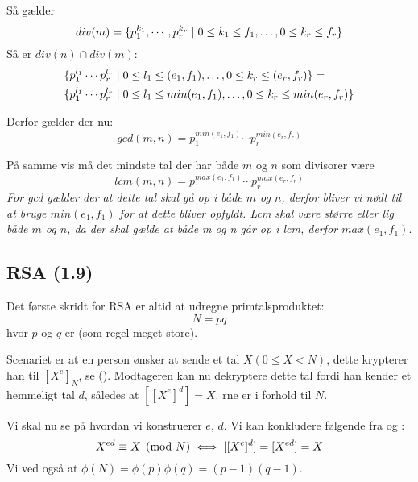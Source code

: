 Så gælder
\begin{equation*}
  div(m) = \{  p_1 ^ {k_1}, \cdots, p_r ^ {k_r} \mid 0 \leq k_1 \leq f_1,
  \ldots, 0 \leq k_r \leq f_r \}
\end{equation*}
Så er $div(n) \cap div(m)$:
\begin{align*}
  &\{ p_1^{l_1} \cdots p_r^{l_r} \mid 0 \leq l_1 \leq (e_1, f_1),
  \ldots, 0 \leq k_r \leq (e_r,f_r) \}=\\
  &\{ p_1^{l_1} \cdots p_r^{l_r} \mid 0 \leq l_1 \leq min(e_1, f_1),
  \ldots, 0 \leq k_r \leq min(e_r,f_r) \}
\end{align*}

Derfor gælder der nu:
\begin{equation*}
  gcd(m,n) = p_1^{min(e_1 , f_1)} \cdots p_r^{min(e_r , f_r)}
\end{equation*}

På samme vis må det mindste tal der har både $m$ og $n$ som divisorer
være 
\begin{equation*}
  lcm(m,n) = p_1^{max(e_1 , f_1)} \cdots p_r^{max(e_r , f_r)}
\end{equation*}
\textit{For gcd gælder der at dette tal skal gå op i både $m$ og $n$, derfor
bliver vi nødt til at bruge $min(e_1 , f_1)$ for at dette bliver opfyldt. Lcm
skal være større eller lig både $m$ og $n$, da der skal gælde at både m og n
går op i lcm, derfor $max(e_1 , f_1)$}.


\subsection{RSA (1.9)}
Det første skridt for RSA er altid at udregne primtalsproduktet:
\begin{equation*}
  N = pq
\end{equation*}
hvor $p$ og $q$ er  (som regel meget store).

Scenariet er at en person ønsker at sende et tal $X (0 \leq X < N)$, dette
krypterer han til $[X^e]_N$, se (). Modtageren
kan nu dekryptere dette tal fordi han kender et hemmeligt tal $d$, således at
$[[X^e]^d] = X$. rne er i forhold til $N$.

Vi skal nu se på hvordan vi konstruerer $e$, $d$. Vi kan konkludere følgende
fra  og :
\begin{equation}
\label{rsa}
  X^{ed} \equiv X \pmod{N} \iff [[X^e]^d] = [X^{ed}] = X
\end{equation}
Vi ved også at $\phi(N) = \phi(p)\phi(q) = (p-1) (q-1)$.

